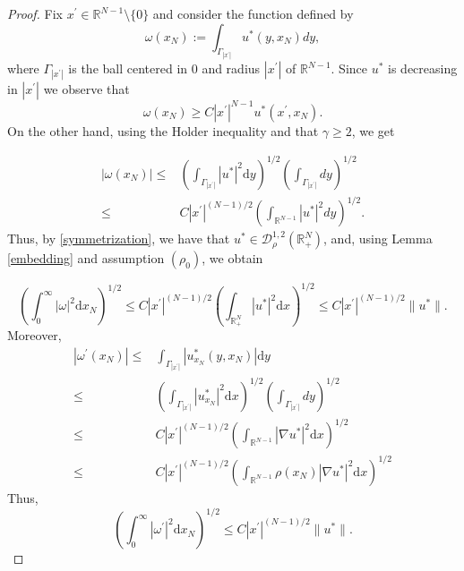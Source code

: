 \documentclass[12pt,reqno]{amsart}
\begin{document}
	\begin{proof} Fix $x^\prime \in \mathds{R}^{N-1}\setminus\{0\}$ and consider the function defined by 
		\begin{equation*}
			\omega(x_N):=\int_{\Gamma_{|x^\prime|}}u^\ast(y,x_N)dy,
		\end{equation*}
		where $\Gamma_{|x^\prime|}$ is the ball centered in $0$ and radius $|x^\prime|$ of $\mathds{R}^{N-1}$. Since $u^\ast$ is decreasing in $|x^\prime|$ we observe that 
		\begin{equation}\label{left inequality}
			\omega(x_N)\geq C|x^\prime|^{N-1}u^\ast(x^\prime,x_N).
		\end{equation}
		On the other hand, using the Holder inequality and that $\gamma\geq 2$, we get
	
        \begin{align*}
			|\omega(x_N)|\leq& \left(\int_{\Gamma_{|x^\prime|}}|u^\ast|^2\mathrm{d}y\right)^{1/2}\left(\int_{\Gamma_{|x^\prime|}}dy\right)^{1/2}\\
			\leq& C|x^\prime|^{(N-1)/2} \left(\int_{\mathds{R}^{N-1}}|u^\ast|^2dy\right)^{1/2}.
		\end{align*}
Thus, by \eqref{symmetrization}, we have that $u^\ast \in \mathcal{D}^{1,2}_\rho(\mathds{R}^N_+)$, and, using Lemma \ref{embedding} and assumption $(\rho_0)$, we obtain
	
        \begin{equation}\label{w inequality}
			\left(\int_{0}^{\infty}|\omega|^2\mathrm{d}x_N\right)^{1/2}\leq C|x^\prime|^{(N-1)/2} \left(\int_{\mathds{R}^N_+}|u^\ast|^2\mathrm{d}x\right)^{1/2}\leq  C|x^\prime|^{(N-1)/2}\|u^\ast\|.
		\end{equation}
Moreover,  
		\begin{align*}
			|\omega^\prime(x_N)|\leq&\int_{\Gamma_{|x^\prime|}}|u^\ast_{x_N}(y,x_N)|\mathrm{d}y\\
            \leq& \left(\int_{\Gamma_{|x^\prime|}}|u_{x_N}^\ast|^2\mathrm{d}x\right)^{1/2}\left(\int_{\Gamma_{|x^\prime|}}dy\right)^{1/2}\\
            \leq& C |x^\prime|^{(N-1)/2}\left(\int_{\mathds{R}^{N-1}}|\nabla u^\ast|^2\mathrm{d}x\right)^{1/2}\\
            \leq& C |x^\prime|^{(N-1)/2}\left(\int_{\mathds{R}^{N-1}}\rho(x_N)|\nabla u^\ast|^2\mathrm{d}x\right)^{1/2}
		\end{align*}
Thus,
        \begin{equation}\label{psi derivative}
\left(\int_{0}^{\infty}|\omega^\prime|^2\mathrm{d}x_N\right)^{1/2}\leq C|x^\prime|^{(N-1)/2}\|u^\ast\|.
		\end{equation}


\end{proof}
\end{document}
